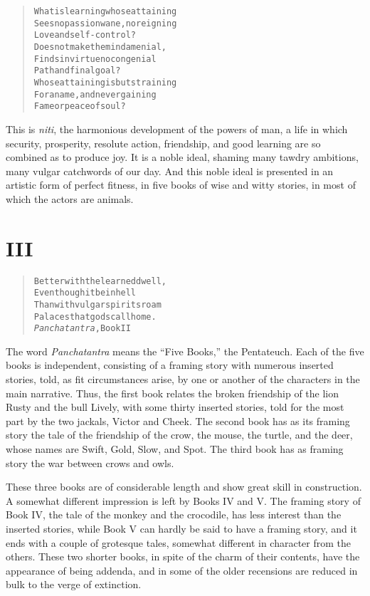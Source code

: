 \documentclass[article, twoside, 10pt]{memoir}
\renewenvironment{verbatim}{%
\begin{quote}%
\vskip -10pt%
\begin{alltt}\normalfont\small}{\end{alltt}%
\end{quote}%
\vskip -10pt
} %
\begin{document}
\begin{verbatim}
What is learning whose attaining
Sees no passion wane, no reigning
    Love and self-control?
Does not make the mind a menial,
Finds in virtue no congenial
    Path and final goal?
Whose attaining is but straining
For a name, and never gaining
    Fame or peace of soul?
\end{verbatim}
This is \emph{niti}, the harmonious development of the powers of
man, a life in which security, prosperity, resolute action,
friendship, and good learning are so combined as to produce joy. It
is a noble ideal, shaming many tawdry ambitions, many vulgar
catchwords of our day. And this noble ideal is presented in an
artistic form of perfect fitness, in five books of wise and witty
stories, in most of which the actors are animals.

\section{III}

\begin{verbatim}
Better with the learned dwell,
Even though it be in hell
Than with vulgar spirits roam
Palaces that gods call home.
        {\textemdash}\emph{Panchatantra}, Book II
\end{verbatim}
The word \emph{Panchatantra} means the ``Five Books,'' the
Pentateuch. Each of the five books is independent, consisting of a
framing story with numerous inserted stories, told, as fit
circumstances arise, by one or another of the characters in the
main narrative. Thus, the first book relates the broken friendship
of the lion Rusty and the bull Lively, with some thirty inserted
stories, told for the most part by the two jackals, Victor and
Cheek. The second book has as its framing story the tale of the
friendship of the crow, the mouse, the turtle, and the deer, whose
names are Swift, Gold, Slow, and Spot. The third book has as
framing story the war between crows and owls.

These three books are of considerable length and show great skill
in construction. A somewhat different impression is left by Books
IV and V. The framing story of Book IV, the tale of the monkey and
the crocodile, has less interest than the inserted stories, while
Book V can hardly be said to have a framing story, and it ends with
a couple of grotesque tales, somewhat different in character from
the others. These two shorter books, in spite of the charm of their
contents, have the appearance of being addenda, and in some of the
older recensions are reduced in bulk to the verge of extinction.
\end{document}
